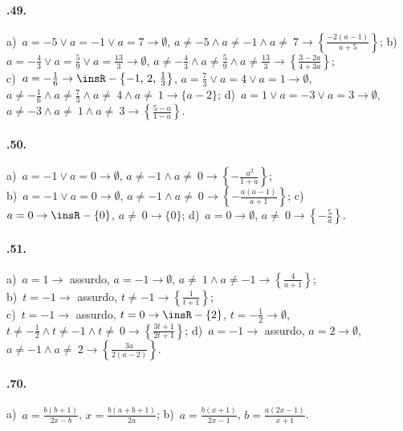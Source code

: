 \paragraph{\thechapter.49.}
a)~$a=-5\vee a=-1\vee a=7 \rightarrow \emptyset$, $a\neq -5\wedge a\neq -1\wedge a\neq~7 \rightarrow \left\{\frac{-2(a-1)}{a+5}\right\}$;
\quad b)~$a=-{\frac{4}{3}}\vee a=\frac{5}{9}\vee a=\frac{13}{3} \rightarrow \emptyset$, $a\neq -{\frac{4}{3}}\wedge a\neq \frac{5}{9}\wedge a\neq \frac{13}{3} \rightarrow \left\{\frac{3-2a}{4+3a}\right\}$;
\protect\\ c)~$a=-{\frac{1}{6}} \rightarrow \insR-\left\{-1\text{,~}2\text{,~}\frac{1}{3}\right\}$, $a=\frac{7}{3}\vee a=4\vee a=1 \rightarrow \emptyset$, $a\neq -{\frac{1}{6}}\wedge a\neq \frac{7}{3}\wedge a\neq~4\wedge a\neq~1 \rightarrow \{a-2\}$;
\quad d)~$a=1\vee a=-3\vee a=3 \rightarrow \emptyset$, $a\neq -3\wedge a\neq~1\wedge a\neq~3 \rightarrow \left\{\frac{5-a}{1-a}\right\}$.

\paragraph{\thechapter.50.}
a)~$a=-1\vee a=0 \rightarrow \emptyset$, $a\neq -1\wedge a\neq~0 \rightarrow \left\{-{\frac{\ a^{2}}{1+a}}\right\}$;
\protect\\ b)~$a=-1\vee a=0 \rightarrow \emptyset$, $a\neq -1\wedge a\neq~0 \rightarrow \left\{-{\frac{a(a-1)}{a+1}}\right\}$;
\quad c)~$a=0 \rightarrow \insR-\{0\}$, $a\neq~0 \rightarrow \{0\}$;
\quad d)~$a=0 \rightarrow \emptyset$, $a\neq~0 \rightarrow \left\{-{\frac{5}{a}}\right\}$.

\paragraph{\thechapter.51.}
a)~$a=1 \rightarrow$ assurdo, $a=-1 \rightarrow \emptyset$, $a\neq~1\wedge a\neq -1 \rightarrow \left\{\frac{4}{a+1}\right\}$;
\protect\\ b)~$t=-1 \rightarrow$ assurdo, $t\neq -1 \rightarrow \left\{\frac{1}{t+1}\right\}$;
\protect\\ c)~$t=-1 \rightarrow$ assurdo, $t=0 \rightarrow \insR-\{2\}$, $t=-{\frac{1}{2}} \rightarrow \emptyset$, $t\neq -\frac{1}{2}\wedge t\neq -1\wedge t\neq~0 \rightarrow \left\{\frac{3t+1}{2t+1}\right\}$;
\quad d)~$a=-1 \rightarrow$ assurdo, $a=2 \rightarrow \emptyset$, $a\neq -1\wedge a\neq~2 \rightarrow \left\{\frac{3a}{2(a-2)}\right\}$.

\paragraph{\thechapter.70.}
a)~$a=\frac{b(b+1)}{2x-b}$, $x=\frac{b(a+b+1)}{2a}$;
\quad b)~$a=\frac{b(x+1)}{2x-1}$, $b=\frac{a(2x-1)}{x+1}$.
